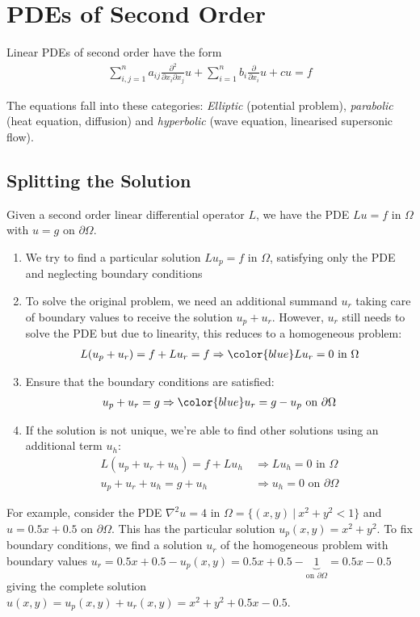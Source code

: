 \section{PDEs of Second Order}

Linear PDEs of second order have the form
\begin{align*}
	\sum_{i,j=1}^n a_{ij}\frac{\partial ^2}{\partial x_i\partial x_j}u+\sum_{i=1}^nb_i\frac{\partial}{\partial x_i}u + cu = f
\end{align*}

The equations fall into these categories: 
\emph{Elliptic} (potential problem), \emph{parabolic} (heat equation, diffusion)
and \emph{hyperbolic} (wave equation, linearised supersonic flow).

\subsection{Splitting the Solution}

Given a second order linear differential operator $L$,
we have the PDE $Lu = f \text{ in }\Omega$ with $u = g \text{ on }\partial\Omega$.

\begin{enumerate}
	\item We try to find a particular solution {\color{blue}$Lu_p = f$ in $\Omega$}, satisfying only the PDE and neglecting boundary conditions
	\item{
		To solve the original problem,
		we need an additional summand $u_r$ taking care of boundary values to receive the solution $u_p + u_r$.
		However, $u_r$ still needs to solve the PDE but due to linearity, this reduces to a homogeneous problem:
		\begin{align*}
			L(u_p + u_r) = f + Lu_r = f \Rightarrow{\color{blue} Lu_r = 0\text{ in }\Omega}
		\end{align*}
	}
	\item{
		Ensure that the boundary conditions are satisfied:
		\begin{align*}
			u_p+u_r = g \Rightarrow {\color{blue}u_r = g - u_p\text{ on }\partial\Omega}
		\end{align*}
	}
	\item{
		If the solution is not unique, we're able to find other solutions using an additional term $u_h$:
		\begin{align*}
			L(u_p + u_r + u_h) = f + Lu_h &\ \Rightarrow Lu_h = 0\text{ in }\Omega \\
			u_p + u_r + u_h = g + u_h &\ \Rightarrow u_h = 0\text{ on }\partial\Omega
		\end{align*}
	}
\end{enumerate}

For example, consider the PDE $\nabla^2 u = 4$ in $\Omega = \{(x,y)\ |\ x^2 + y^2 < 1\}$ and $u = 0.5x+0.5$ on $\partial\Omega$.
This has the particular solution $u_p(x,y)=x^2+y^2$. 
To fix boundary conditions, we find a solution $u_r$ of the homogeneous problem with boundary values
$u_r = 0.5x + 0.5 - u_p(x,y) = 0.5x + 0.5 - \underbrace{1}_{\text{on }\partial\Omega} = 0.5x - 0.5$ giving the complete solution
$u(x,y) = u_p(x,y) + u_r(x,y) = x^2 + y^2 + 0.5x - 0.5$.